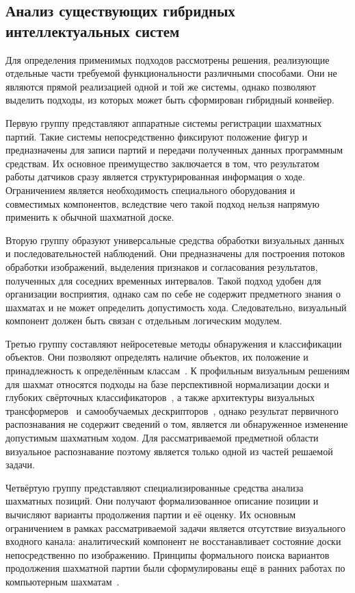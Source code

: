 \subsection{Анализ существующих гибридных интеллектуальных систем}

Для определения применимых подходов рассмотрены решения, реализующие отдельные части требуемой функциональности различными способами. Они не являются прямой реализацией одной и той же системы, однако позволяют выделить подходы, из которых может быть сформирован гибридный конвейер.

Первую группу представляют аппаратные системы регистрации шахматных партий. Такие системы непосредственно фиксируют положение фигур и предназначены для записи партий и передачи полученных данных программным средствам. Их основное преимущество заключается в том, что результатом работы датчиков сразу является структурированная информация о ходе. Ограничением является необходимость специального оборудования и совместимых компонентов, вследствие чего такой подход нельзя напрямую применить к обычной шахматной доске.

Вторую группу образуют универсальные средства обработки визуальных данных и последовательностей наблюдений. Они предназначены для построения потоков обработки изображений, выделения признаков и согласования результатов, полученных для соседних временных интервалов. Такой подход удобен для организации восприятия, однако сам по себе не содержит предметного знания о шахматах и не может определить допустимость хода. Следовательно, визуальный компонент должен быть связан с отдельным логическим модулем.

Третью группу составляют нейросетевые методы обнаружения и классификации объектов. Они позволяют определять наличие объектов, их положение и принадлежность к определённым классам~\cite{Goodfellow2016}. К профильным визуальным решениям для шахмат относятся подходы на базе перспективной нормализации доски и глубоких свёрточных классификаторов~\cite{Wolflein2021}, а также архитектуры визуальных трансформеров~\cite{Dosovitskiy2021} и самообучаемых дескрипторов~\cite{Oquab2024}, однако результат первичного распознавания не содержит сведений о том, является ли обнаруженное изменение допустимым шахматным ходом. Для рассматриваемой предметной области визуальное распознавание поэтому является только одной из частей решаемой задачи.

Четвёртую группу представляют специализированные средства анализа шахматных позиций. Они получают формализованное описание позиции и вычисляют варианты продолжения партии и её оценку. Их основным ограничением в рамках рассматриваемой задачи является отсутствие визуального входного канала: аналитический компонент не восстанавливает состояние доски непосредственно по изображению. Принципы формального поиска вариантов продолжения шахматной партии были сформулированы ещё в ранних работах по компьютерным шахматам~\cite{Shannon1950}.

